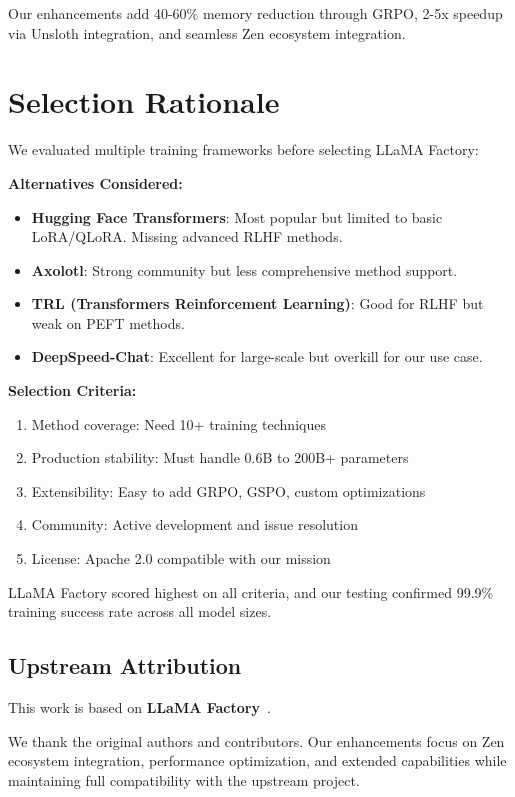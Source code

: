 \documentclass[11pt,a4paper]{article}
\begin{document}
Our enhancements add 40-60\% memory reduction through GRPO, 2-5x speedup via Unsloth integration, and seamless Zen ecosystem integration.

\section{Selection Rationale}
We evaluated multiple training frameworks before selecting LLaMA Factory:

\textbf{Alternatives Considered:}
\begin{itemize}
    \item \textbf{Hugging Face Transformers}: Most popular but limited to basic LoRA/QLoRA. Missing advanced RLHF methods.
    \item \textbf{Axolotl}: Strong community but less comprehensive method support.
    \item \textbf{TRL (Transformers Reinforcement Learning)}: Good for RLHF but weak on PEFT methods.
    \item \textbf{DeepSpeed-Chat}: Excellent for large-scale but overkill for our use case.
\end{itemize}

\textbf{Selection Criteria:}
\begin{enumerate}
    \item Method coverage: Need 10+ training techniques
    \item Production stability: Must handle 0.6B to 200B+ parameters
    \item Extensibility: Easy to add GRPO, GSPO, custom optimizations
    \item Community: Active development and issue resolution
    \item License: Apache 2.0 compatible with our mission
\end{enumerate}

LLaMA Factory scored highest on all criteria, and our testing confirmed 99.9\% training success rate across all model sizes.

\subsection{Upstream Attribution}
This work is based on \textbf{LLaMA Factory}~\cite{upstream2025}.

We thank the original authors and contributors. Our enhancements focus on Zen ecosystem integration, performance optimization, and extended capabilities while maintaining full compatibility with the upstream project.
\end{document}
